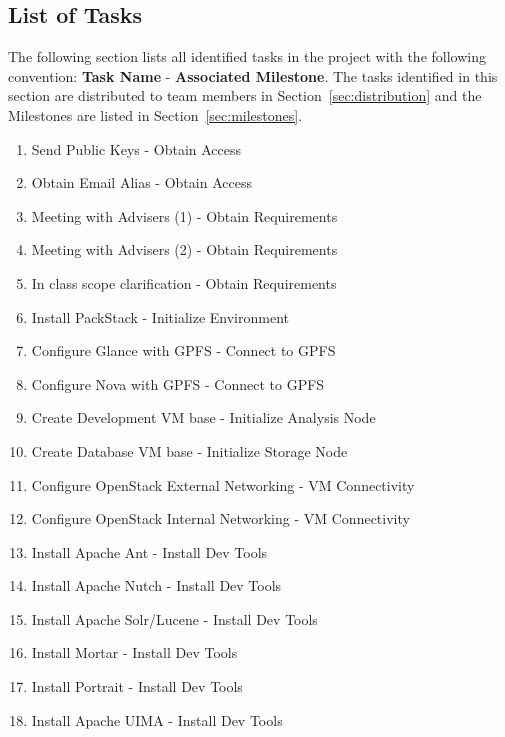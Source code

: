 \subsection{List of Tasks}
\label{sec:tasks}

The following section lists all identified tasks in the project with the
following convention: \textbf{Task Name} - \textbf{Associated
Milestone}. The tasks identified in this section are distributed to team
members in Section~\ref{sec:distribution} and the Milestones are listed
in Section~\ref{sec:milestones}.

\begin{enumerate}
  \item Send Public Keys - Obtain Access
  \item Obtain Email Alias - Obtain Access 

  \item Meeting with Advisers (1) - Obtain Requirements
  \item Meeting with Advisers (2) - Obtain Requirements
  \item In class scope clarification - Obtain Requirements

  \item Install PackStack - Initialize Environment

  \item Configure Glance with GPFS - Connect to GPFS
  \item Configure Nova with GPFS - Connect to GPFS

  \item Create Development VM base - Initialize Analysis Node
  \item Create Database VM base - Initialize Storage Node

  \item Configure OpenStack External Networking - VM Connectivity
  \item Configure OpenStack Internal Networking - VM Connectivity
  
  \item Install Apache Ant - Install Dev Tools
  \item Install Apache Nutch - Install Dev Tools
  \item Install Apache Solr/Lucene - Install Dev Tools
  \item Install Mortar - Install Dev Tools
  \item Install Portrait - Install Dev Tools
  \item Install Apache UIMA - Install Dev Tools


\end{enumerate}

